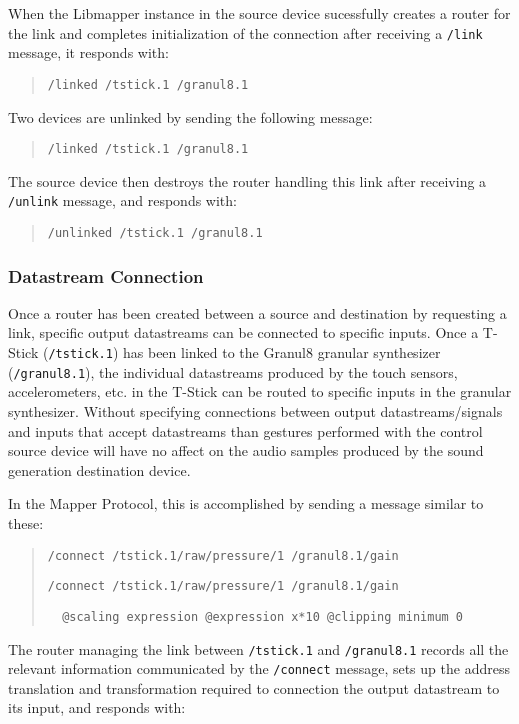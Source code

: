 When the Libmapper instance in the source device sucessfully creates a router for the link and completes initialization of the connection after receiving a \verb#/link# message, it responds with:

\begin{quote}
\verb#/linked /tstick.1 /granul8.1#
\end{quote}

Two devices are unlinked by sending the following message:

\begin{quote}
\verb#/linked /tstick.1 /granul8.1#
\end{quote}

The source device then destroys the router handling this link after receiving a \verb#/unlink# message, and responds with:

\begin{quote}
\verb#/unlinked /tstick.1 /granul8.1#
\end{quote}

\subsubsection{Datastream Connection}

Once a router has been created between a source and destination by requesting a link, specific output datastreams can be connected to specific inputs. Once a T-Stick (\verb#/tstick.1#) has been linked to the Granul8 granular synthesizer (\verb#/granul8.1#), the individual datastreams produced by the touch sensors, accelerometers, etc. in the T-Stick can be routed to specific inputs in the granular synthesizer. Without specifying connections between output datastreams/signals and inputs that accept datastreams than gestures performed with the control source device will have no affect on the audio samples produced by the sound generation destination device. 

In the Mapper Protocol, this is accomplished by sending a message similar to these:

\begin{quote}
\verb#/connect /tstick.1/raw/pressure/1 /granul8.1/gain#

\verb#/connect /tstick.1/raw/pressure/1 /granul8.1/gain#

\verb#  @scaling expression @expression x*10 @clipping minimum 0#
\end{quote}

The router managing the link between \verb#/tstick.1# and \verb#/granul8.1# records all the relevant information communicated by the \verb#/connect# message, sets up the address translation and transformation required to connection the output datastream to its input, and responds with:

